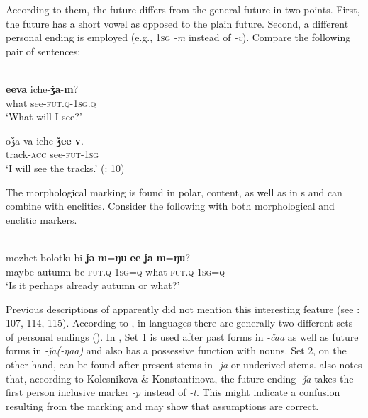 According to them, the  future differs from the general future in two points. First, the  future has a short vowel as opposed to the plain future. Second, a different personal ending is employed (e.g., 1\textsc{sg} \textit{-m} instead of \textit{-v}). Compare the following pair of sentences:

\ea%
    \label{ex:tungu:33}
    \\
    \ea
    \gll \textbf{{e}}\textbf{{eva}} iche-\textbf{{ǯa}}{-}\textbf{{m}}?\\
    what    see-\textsc{fut}.\textsc{q}-1\textsc{sg.q}\\
    \glt ‘What will I see?’
    
    \ex
    \gll oǯ{a-va    iche-}\textbf{{ǯ}}\textbf{{ee}}{-}\textbf{{v}}.\\
    track-\textsc{acc}  see-\textsc{fut}-1\textsc{sg}\\
    \glt ‘I will see the tracks.’ (\citealt{KhasanovaPevnov2003}: 10)
    \z
    \z

The morphological  marking is found in polar, content, as well as in s and can combine with  enclitics. Consider the following  with both morphological and enclitic markers.

\ea%
    \label{ex:tungu:34}
    \\
    \gll mozhet  bolotkı    bi-\textbf{{ǰə}}{-}\textbf{{m}}{=}\textbf{{ŋu}} \textbf{{ee}}{-}\textbf{{ǰa}}{-}\textbf{{m}}{=}\textbf{{ŋu}}?\\
    maybe    autumn    be-\textsc{fut}.\textsc{q}-1\textsc{sg}=\textsc{q}  what-\textsc{fut}.\textsc{q}-1\textsc{sg}=\textsc{q}\\
    \glt ‘Is it perhaps already autumn or what?’ \citep[114]{Kazama2002a}
    \z

Previous descriptions of  apparently did not mention this interesting feature (see \citealt{Kazama2002a}: 107, 114, 115). According to \citet{Ikegami1985}, in  languages there are generally two different sets of personal endings (). In , Set 1 is used after past forms in \textit{-čaa} as well as future forms in \textit{-ǰa(-ŋaa)} and also has a possessive function with nouns. Set 2, on the other hand, can be found after present stems in \textit{-ja} or underived stems. \citet[91]{Ikegami1985} also notes that, according to Kolesnikova \& Konstantinova, the future ending \textit{-ǰa} takes the first person inclusive marker \textit{-p} instead of \textit{-t}. This might indicate a confusion resulting from the  marking and may show that  assumptions are correct.

